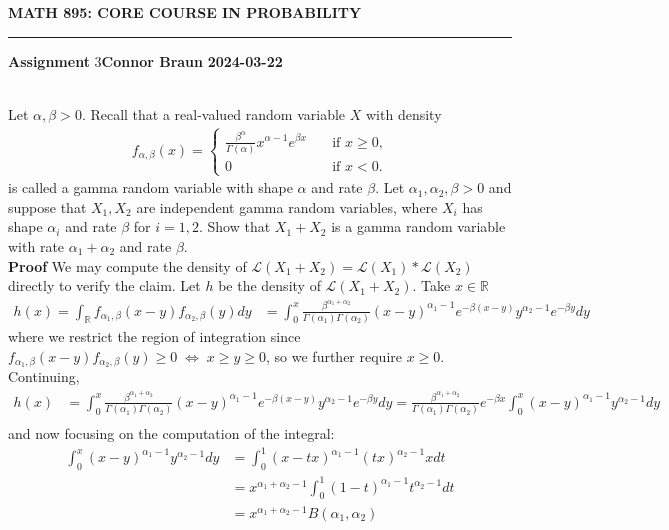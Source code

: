 \documentclass[10pt]{article}
\newcommand{\mbb}[1]{\mathbb{#1}}
\newcommand{\1}[1]{\mathbbm{1}_{#1}}
\newcommand{\mc}[1]{\mathcal{#1}}
\begin{document}
    \begin{center}
        {\bf\large{MATH 895: CORE COURSE IN PROBABILITY}}
        \smallskip
        \hrule
        \smallskip
        {\bf Assignment} 3\hfill {\bf Connor Braun} \hfill {\bf 2024-03-22}
    \end{center}
    \\[5pt]
    Let $\alpha,\beta>0$. Recall that a real-valued random variable $X$ with density
    \begin{align*}
        f_{\alpha,\beta}(x)=\begin{cases}
            \frac{\beta^\alpha}{\Gamma(\alpha)}x^{\alpha-1}e^{\beta x}\quad&\text{if $x\geq 0$,}\\
            0\quad&\text{if $x<0$.}
        \end{cases}
    \end{align*}
    is called a gamma random variable with shape $\alpha$ and rate $\beta$. Let $\alpha_1,\alpha_2,\beta>0$ and suppose that $X_1,X_2$ are independent gamma random variables,
    where $X_i$ has shape $\alpha_i$ and rate $\beta$ for $i=1,2$. Show that $X_1+X_2$ is a gamma random variable with rate $\alpha_1+\alpha_2$ and rate $\beta$.\\[5pt]
    {\bf Proof}\hspace{5pt} We may compute the density of $\mc{L}(X_1+X_2)=\mc{L}(X_1)\ast\mc{L}(X_2)$ directly to verify the claim. Let $h$ be the density of $\mc{L}(X_1+X_2)$. Take $x\in\mbb{R}$
    \begin{align*}
        h(x)=\int_{\mbb{R}}f_{\alpha_1,\beta}(x-y)f_{\alpha_2,\beta}(y)dy
        &=\int_0^x\frac{\beta^{\alpha_1+\alpha_2}}{\Gamma(\alpha_1)\Gamma(\alpha_2)}(x-y)^{\alpha_1-1}e^{-\beta(x-y)}y^{\alpha_2-1}e^{-\beta y}dy
    \end{align*}
    where we restrict the region of integration since $f_{\alpha_1,\beta}(x-y)f_{\alpha_2,\beta}(y)\geq 0\;\Leftrightarrow\;x\geq y\geq 0$, so we further require $x\geq 0$. Continuing,
    \begin{align*}
        h(x)&=\int_0^x\frac{\beta^{\alpha_1+\alpha_2}}{\Gamma(\alpha_1)\Gamma(\alpha_2)}(x-y)^{\alpha_1-1}e^{-\beta(x-y)}y^{\alpha_2-1}e^{-\beta y}dy
        =\frac{\beta^{\alpha_1+\alpha_2}}{\Gamma(\alpha_1)\Gamma(\alpha_2)}e^{-\beta x}\int_0^x(x-y)^{\alpha_1-1}y^{\alpha_2-1}dy\\
    \end{align*}
    and now focusing on the computation of the integral:
    \begin{align*}
        \int_0^x(x-y)^{\alpha_1-1}y^{\alpha_2-1}dy&=\int_0^1(x-tx)^{\alpha_1-1}(tx)^{\alpha_2-1}xdt\tag{substituting $y=tx$}\\
        &=x^{\alpha_1+\alpha_2-1}\int_0^1(1-t)^{\alpha_1-1}t^{\alpha_2-1}dt\\
        &=x^{\alpha_1+\alpha_2-1}B(\alpha_1,\alpha_2)
    \end{align*}
\end{document}
